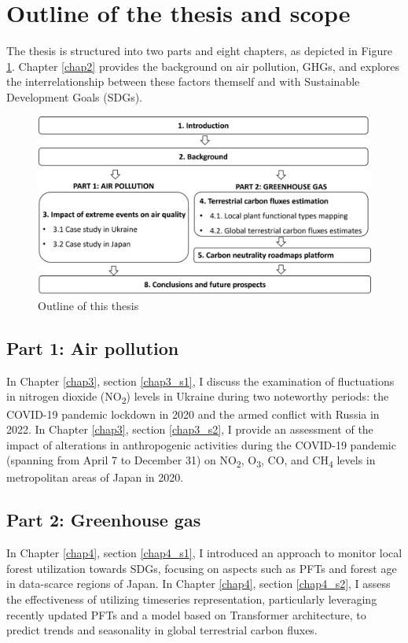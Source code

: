 \section{Outline of the thesis and scope}

The thesis is structured into two parts and eight chapters, as depicted in Figure \ref{fig:chap1_fig2}. Chapter \ref{chap2} provides the background on air pollution, GHGs, and explores the interrelationship between these factors themself and with Sustainable Development Goals (SDGs). \par
\begin{figure}[tbh!]
    \centering
    \includegraphics[width=\textwidth]{figs/chap1/outline.png}
    \caption{Outline of this thesis}
    \label{fig:chap1_fig2}
\end{figure}
\subsection*{Part 1: Air pollution}

In Chapter \ref{chap3}, section \ref{chap3_s1}, I discuss the examination of fluctuations in nitrogen dioxide (NO\textsubscript{2}) levels in Ukraine during two noteworthy periods: the COVID-19 pandemic lockdown in 2020 and the armed conflict with Russia in 2022. In Chapter \ref{chap3}, section \ref{chap3_s2}, I provide an assessment of the impact of alterations in anthropogenic activities during the COVID-19 pandemic (spanning from April 7 to December 31) on NO\textsubscript{2}, O\textsubscript{3}, CO, and CH\textsubscript{4} levels in metropolitan areas of Japan in 2020. \par

\subsection*{Part 2: Greenhouse gas}
In Chapter \ref{chap4}, section \ref{chap4_s1}, I introduced an approach to monitor local forest utilization towards SDGs, focusing on aspects such as PFTs and forest age in data-scarce regions of Japan. In Chapter \ref{chap4}, section \ref{chap4_s2}, I assess the effectiveness of utilizing timeseries representation, particularly leveraging recently updated PFTs and a model based on Transformer architecture, to predict trends and seasonality in global terrestrial carbon fluxes. \par

